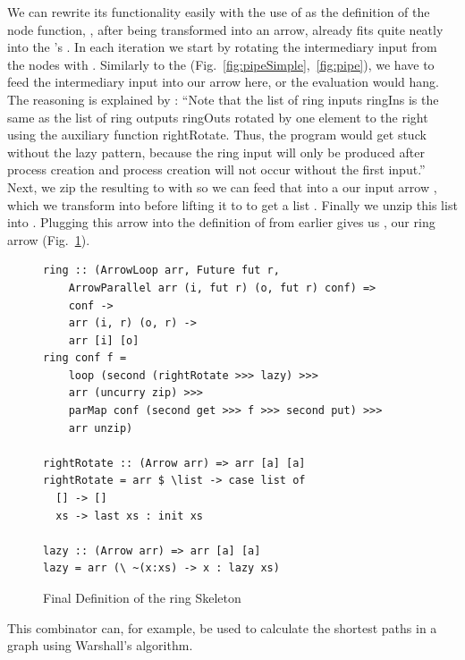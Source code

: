 We can rewrite its functionality easily with the use of  as the definition of the node function, , after being transformed into an arrow, already fits quite neatly into the 's . In each iteration we start by rotating the intermediary input from the nodes \code{[fut r]} with . Similarly to the  (Fig.~\ref{fig:pipeSimple},~\ref{fig:pipe}), we have to feed the intermediary input into our  arrow here, or the evaluation would hang. The reasoning is explained by \citet{Loogen2012}:
\enquote{Note that the list of ring inputs ringIns is the same as the list of ring outputs ringOuts rotated by one element to the right using the auxiliary function rightRotate. Thus, the program would get stuck without the lazy pattern, because the ring input will only be produced after process creation and process creation will not occur without the first input.}
Next, we zip the resulting \code{([i], [fut r])} to \code{[(i, fut r)]} with  so we can feed that into a our input arrow , which we transform into  before lifting it to  to get a list \code{[(o, fut r)]}. Finally we unzip this list into \code{([o], [fut r])}. Plugging this arrow  into the definition of  from earlier gives us , our ring arrow (Fig.~\ref{fig:ringFinal}).
\begin{figure}[h]
\begin{lstlisting}[frame=htrbl]
ring :: (ArrowLoop arr, Future fut r,
	ArrowParallel arr (i, fut r) (o, fut r) conf) =>
    conf ->
    arr (i, r) (o, r) ->
    arr [i] [o]
ring conf f =
	loop (second (rightRotate >>> lazy) >>>
    arr (uncurry zip) >>>
    parMap conf (second get >>> f >>> second put) >>>
    arr unzip)

rightRotate :: (Arrow arr) => arr [a] [a]
rightRotate = arr $ \list -> case list of 
  [] -> []
  xs -> last xs : init xs

lazy :: (Arrow arr) => arr [a] [a]
lazy = arr (\ ~(x:xs) -> x : lazy xs)
\end{lstlisting}
\caption{Final Definition of the ring Skeleton}
\label{fig:ringFinal}
\end{figure}
This combinator can, for example, be used to calculate the shortest paths in a graph using Warshall's algorithm. 
